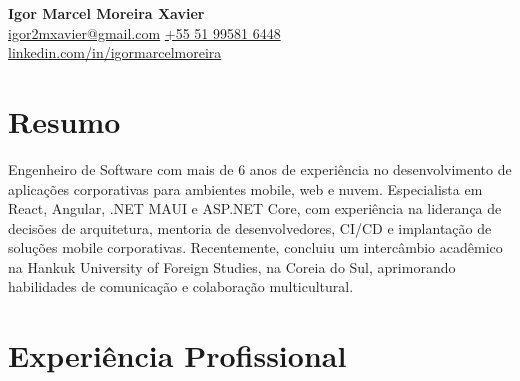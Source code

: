\documentclass[a4paper,10pt]{article}
\begin{document}
\begin{center}
    {\LARGE \textbf{Igor Marcel Moreira Xavier}} \\
    \vspace{2mm}
    \href{mailto:igor2mxavier@gmail.com}{igor2mxavier@gmail.com} \quad
    \href{tel:+5551995816448}{+55 51 99581 6448} \\
    \href{https://linkedin.com/in/igormarcelmoreira}{linkedin.com/in/igormarcelmoreira}
\end{center}

\vspace{4mm}

\section*{Resumo}

Engenheiro de Software com mais de 6 anos de experiência no desenvolvimento de aplicações corporativas para ambientes mobile, web e nuvem. Especialista em React, Angular, .NET MAUI e ASP.NET Core, com experiência na liderança de decisões de arquitetura, mentoria de desenvolvedores, CI/CD e implantação de soluções mobile corporativas. Recentemente, concluiu um intercâmbio acadêmico na Hankuk University of Foreign Studies, na Coreia do Sul, aprimorando habilidades de comunicação e colaboração multicultural.

\section*{Experiência Profissional}
\end{document}
